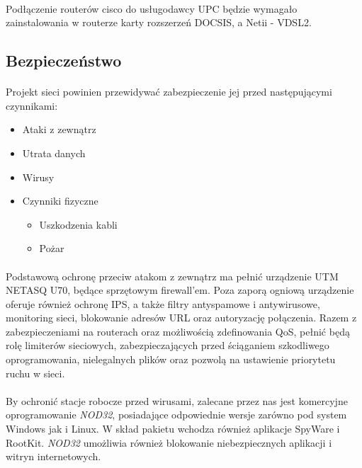 \paragraph{}
Podłączenie routerów cisco do usługodawcy UPC będzie wymagało zainstalowania w routerze karty rozszerzeń DOCSIS, a Netii - VDSL2. 

\subsection{Bezpieczeństwo}
\paragraph{}
Projekt sieci powinien przewidywać zabezpieczenie jej przed następującymi czynnikami:
\begin{itemize}
	\item Ataki z zewnątrz 
	\item Utrata danych
	\item Wirusy
	\item Czynniki fizyczne
	\begin{itemize}
		\item Uszkodzenia kabli
		\item Pożar
	\end{itemize}
\end{itemize}

\paragraph{}
Podstawową ochronę przeciw atakom z zewnątrz ma pełnić urządzenie UTM NETASQ U70, będące sprzętowym firewall'em. Poza zaporą ogniową  urządzenie oferuje również ochronę IPS, a także filtry antyspamowe i antywirusowe, monitoring sieci, blokowanie adresów URL oraz autoryzację połączenia. Razem z zabezpieczeniami na routerach oraz możliwością zdefinowania QoS, pełnić będą rolę limiterów sieciowych, zabezpieczających przed ściąganiem szkodliwego oprogramowania, nielegalnych plików oraz pozwolą na ustawienie priorytetu ruchu w sieci.

\paragraph{}
By ochronić stacje robocze przed wirusami, zalecane przez nas jest komercyjne oprogramowanie \textit{NOD32}, posiadające odpowiednie wersje zarówno pod system Windows jak i Linux. W skład pakietu wchodza również aplikacje SpyWare i RootKit. \textit{NOD32} umożliwia również blokowanie niebezpiecznych aplikacji i witryn internetowych.

